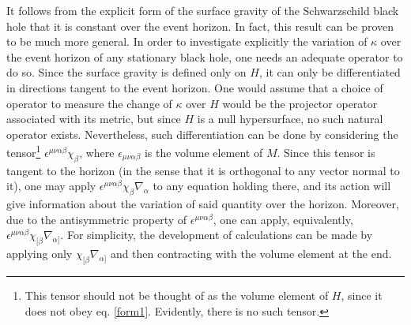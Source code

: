 \documentclass[
12pt,		%
openright,	%
twoside,  %
a4paper,			%
chapter=TITLE,		%
english,			%
french,				%
spanish,			%
brazil				%
]{USPSC-classe/USPSC}
\begin{document}
It follows from the explicit form of the surface gravity of the Schwarzschild black hole that it is constant over the event horizon. In fact, this result can be proven to be much more general. In order to investigate explicitly the variation of $\kappa$ over the event horizon of any stationary black hole, one needs an adequate operator to do so. Since the surface gravity is defined only on $H$, it can only be differentiated in directions tangent to the event horizon. One would assume that a choice of operator to measure the change of $\kappa$ over $H$ would be the projector operator associated with its metric, but since $H$ is a null hypersurface, no such natural operator exists. Nevertheless, such differentiation can be done by considering the tensor\footnote{This tensor should not be thought of as the volume element of $H$, since it does not obey eq. \ref{form1}. Evidently, there is no such tensor.} $\epsilon^{\mu\nu\alpha\beta}\chi_{\beta}$, where $\epsilon_{\mu\nu\alpha\beta}$ is the volume element of $M$. Since this tensor is tangent to the horizon (in the sense that it is orthogonal to any vector normal to it), one may apply $\epsilon^{\mu\nu\alpha\beta}\chi_{\beta}\nabla_{\alpha}$ to any equation holding there, and its action will give information about the variation of said quantity over the horizon. Moreover, due to the antisymmetric property of $\epsilon^{\mu\nu\alpha\beta}$, one can apply, equivalently, $\epsilon^{\mu\nu\alpha\beta}\chi_{[\beta}\nabla_{\alpha]}$. For simplicity, the development of calculations can be made by applying only $\chi_{[\beta}\nabla_{\alpha]}$ and then contracting with the volume element at the end.
 
\end{document}
